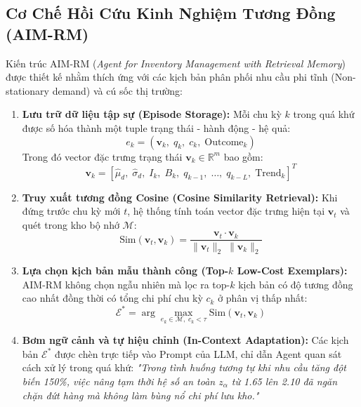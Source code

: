 \documentclass[11pt,a4paper]{article}
\begin{document}
\subsection{Cơ Chế Hồi Cứu Kinh Nghiệm Tương Đồng (AIM-RM)}

Kiến trúc AIM-RM (\textit{Agent for Inventory Management with Retrieval Memory}) được thiết kế nhằm thích ứng với các kịch bản phân phối nhu cầu phi tĩnh (Non-stationary demand) và cú sốc thị trường:

\begin{enumerate}[leftmargin=1.8em]
    \item \textbf{Lưu trữ dữ liệu tập sự (Episode Storage):} Mỗi chu kỳ $k$ trong quá khứ được số hóa thành một tuple trạng thái - hành động - hệ quả:
    \begin{equation}
        e_k = \left( \mathbf{v}_k, \; q_k, \; c_k, \; \text{Outcome}_k \right)
    \end{equation}
    Trong đó vector đặc trưng trạng thái $\mathbf{v}_k \in \mathbb{R}^m$ bao gồm:
    \begin{equation}
        \mathbf{v}_k = \left[ \hat{\mu}_d, \; \hat{\sigma}_d, \; I_k, \; B_k, \; q_{k-1}, \; \dots, \; q_{k-L}, \; \text{Trend}_k \right]^T
    \end{equation}
    \item \textbf{Truy xuất tương đồng Cosine (Cosine Similarity Retrieval):} Khi đứng trước chu kỳ mới $t$, hệ thống tính toán vector đặc trưng hiện tại $\mathbf{v}_t$ và quét trong kho bộ nhớ $\mathcal{M}$:
    \begin{equation}
        \text{Sim}(\mathbf{v}_t, \mathbf{v}_k) = \frac{\mathbf{v}_t \cdot \mathbf{v}_k}{\|\mathbf{v}_t\|_2 \; \|\mathbf{v}_k\|_2}
    \end{equation}
    \item \textbf{Lựa chọn kịch bản mẫu thành công (Top-$k$ Low-Cost Exemplars):} AIM-RM không chọn ngẫu nhiên mà lọc ra top-$k$ kịch bản có độ tương đồng cao nhất đồng thời có tổng chi phí chu kỳ $c_k$ ở phân vị thấp nhất:
    \begin{equation}
        \mathcal{E}^* = \arg\max_{e_k \in \mathcal{M}, \; c_k < \tau} \text{Sim}(\mathbf{v}_t, \mathbf{v}_k)
    \end{equation}
    \item \textbf{Bơm ngữ cảnh và tự hiệu chỉnh (In-Context Adaptation):} Các kịch bản $\mathcal{E}^*$ được chèn trực tiếp vào Prompt của LLM, chỉ dẫn Agent quan sát cách xử lý trong quá khứ: \textit{"Trong tình huống tương tự khi nhu cầu tăng đột biến 150\%, việc nâng tạm thời hệ số an toàn $z_{\alpha}$ từ 1.65 lên 2.10 đã ngăn chặn đứt hàng mà không làm bùng nổ chi phí lưu kho."}
\end{enumerate}
\end{document}
